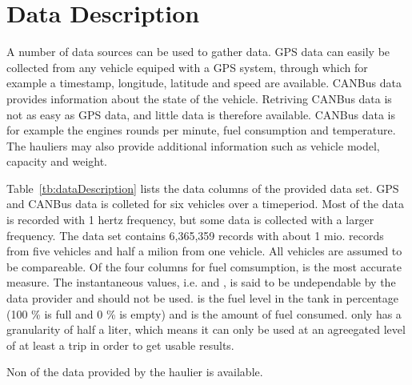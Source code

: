 \section{Data Description}
A number of data sources can be used to gather data.
GPS data can easily be collected from any vehicle equiped with a GPS system, through which for example a timestamp, longitude, latitude and speed are available.
CANBus data provides information about the state of the vehicle.  %
Retriving CANBus data is not as easy as GPS data, and little data is therefore available. 
CANBus data is for example the engines rounds per minute, fuel consumption and temperature. 
The hauliers may also provide additional information such as vehicle model, capacity and weight. 

Table~\ref{tb:dataDescription} lists the data columns of the provided data set.
GPS and CANBus data is colleted for six vehicles over a timeperiod.
Most of the data is recorded with 1 hertz frequency, but some data is collected with a larger frequency.
The data set contains 6,365,359 records with about 1 mio. records from five vehicles and half a milion from one vehicle.
All vehicles are assumed to be compareable.%
Of the four columns for fuel comsumption,  is the most accurate measure.
The instantaneous values, i.e.  and , is said to be undependable by the data provider and should not be used. 
 is the fuel level in the tank in percentage (100 \% is full and 0 \% is empty) and  is the amount of fuel consumed.
 only has a granularity of half a liter, which means it can only be used at an agreegated level of at least a trip in order to get usable results.

Non of the data provided by the haulier is available.
